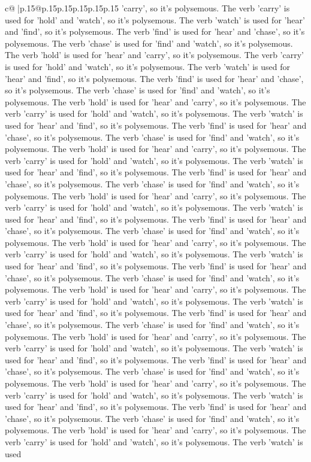 \documentclass{article}
\begin{document}
{\begin{supertabular}{c@{$\;$}|p{.15\linewidth}@{}p{.15\linewidth}p{.15\linewidth}p{.15\linewidth}p{.15\linewidth}p{.15\linewidth}}
{{{'carry', so it's polysemous. The verb 'carry' is used for 'hold' and 'watch', so it's polysemous. The verb 'watch' is used for 'hear' and 'find', so it's polysemous. The verb 'find' is used for 'hear' and 'chase', so it's polysemous. The verb 'chase' is used for 'find' and 'watch', so it's polysemous. The verb 'hold' is used for 'hear' and 'carry', so it's polysemous. The verb 'carry' is used for 'hold' and 'watch', so it's polysemous. The verb 'watch' is used for 'hear' and 'find', so it's polysemous. The verb 'find' is used for 'hear' and 'chase', so it's polysemous. The verb 'chase' is used for 'find' and 'watch', so it's polysemous. The verb 'hold' is used for 'hear' and 'carry', so it's polysemous. The verb 'carry' is used for 'hold' and 'watch', so it's polysemous. The verb 'watch' is used for 'hear' and 'find', so it's polysemous. The verb 'find' is used for 'hear' and 'chase', so it's polysemous. The verb 'chase' is used for 'find' and 'watch', so it's polysemous. The verb 'hold' is used for 'hear' and 'carry', so it's polysemous. The verb 'carry' is used for 'hold' and 'watch', so it's polysemous. The verb 'watch' is used for 'hear' and 'find', so it's polysemous. The verb 'find' is used for 'hear' and 'chase', so it's polysemous. The verb 'chase' is used for 'find' and 'watch', so it's polysemous. The verb 'hold' is used for 'hear' and 'carry', so it's polysemous. The verb 'carry' is used for 'hold' and 'watch', so it's polysemous. The verb 'watch' is used for 'hear' and 'find', so it's polysemous. The verb 'find' is used for 'hear' and 'chase', so it's polysemous. The verb 'chase' is used for 'find' and 'watch', so it's polysemous. The verb 'hold' is used for 'hear' and 'carry', so it's polysemous. The verb 'carry' is used for 'hold' and 'watch', so it's polysemous. The verb 'watch' is used for 'hear' and 'find', so it's polysemous. The verb 'find' is used for 'hear' and 'chase', so it's polysemous. The verb 'chase' is used for 'find' and 'watch', so it's polysemous. The verb 'hold' is used for 'hear' and 'carry', so it's polysemous. The verb 'carry' is used for 'hold' and 'watch', so it's polysemous. The verb 'watch' is used for 'hear' and 'find', so it's polysemous. The verb 'find' is used for 'hear' and 'chase', so it's polysemous. The verb 'chase' is used for 'find' and 'watch', so it's polysemous. The verb 'hold' is used for 'hear' and 'carry', so it's polysemous. The verb 'carry' is used for 'hold' and 'watch', so it's polysemous. The verb 'watch' is used for 'hear' and 'find', so it's polysemous. The verb 'find' is used for 'hear' and 'chase', so it's polysemous. The verb 'chase' is used for 'find' and 'watch', so it's polysemous. The verb 'hold' is used for 'hear' and 'carry', so it's polysemous. The verb 'carry' is used for 'hold' and 'watch', so it's polysemous. The verb 'watch' is used for 'hear' and 'find', so it's polysemous. The verb 'find' is used for 'hear' and 'chase', so it's polysemous. The verb 'chase' is used for 'find' and 'watch', so it's polysemous. The verb 'hold' is used for 'hear' and 'carry', so it's polysemous. The verb 'carry' is used for 'hold' and 'watch', so it's polysemous. The verb 'watch' is used }}}
\end{supertabular}}
\end{document}
